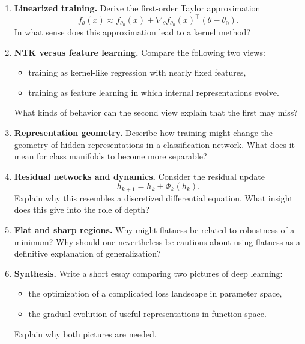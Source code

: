 \begin{enumerate}
    \item \textbf{Linearized training.}
    Derive the first-order Taylor approximation
    \[
    f_\theta(x)\approx f_{\theta_0}(x)+\nabla_\theta f_{\theta_0}(x)^\top(\theta-\theta_0).
    \]
    In what sense does this approximation lead to a kernel method?

    \item \textbf{NTK versus feature learning.}
    Compare the following two views:
    \begin{itemize}
        \item training as kernel-like regression with nearly fixed features,
        \item training as feature learning in which internal representations evolve.
    \end{itemize}
    What kinds of behavior can the second view explain that the first may miss?

    \item \textbf{Representation geometry.}
    Describe how training might change the geometry of hidden representations in a classification network. What does it mean for class manifolds to become more separable?

    \item \textbf{Residual networks and dynamics.}
    Consider the residual update
    \[
    h_{k+1}=h_k+\Phi_k(h_k).
    \]
    Explain why this resembles a discretized differential equation. What insight does this give into the role of depth?

    \item \textbf{Flat and sharp regions.}
    Why might flatness be related to robustness of a minimum? Why should one nevertheless be cautious about using flatness as a definitive explanation of generalization?

    \item \textbf{Synthesis.}
    Write a short essay comparing two pictures of deep learning:
    \begin{itemize}
        \item the optimization of a complicated loss landscape in parameter space,
        \item the gradual evolution of useful representations in function space.
    \end{itemize}
    Explain why both pictures are needed.
\end{enumerate}